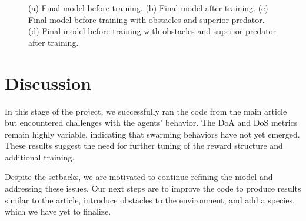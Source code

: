 \documentclass[9pt]{pnas-new}
\begin{document}
\begin{figure}[ht]
		\caption{(a) Final model before training. (b) Final model after training. (c) Final model before training with obstacles and superior predator. (d) Final model before training with obstacles and superior predator after training. }
		\label{fig:final}
	\end{figure}
	
	
	\section*{Discussion}
	In this stage of the project, we successfully ran the code from the main article but encountered challenges with the agents' behavior. 
	The DoA and DoS metrics remain highly variable, indicating that swarming behaviors have not yet emerged. 
	These results suggest the need for further tuning of the reward structure and additional training.
	
	Despite the setbacks, we are motivated to continue refining the model and addressing these issues. 
	Our next steps are to improve the code to produce results similar to the article, introduce obstacles to the environment, and add a species, which we have yet to finalize.
	
	\showacknow %
	
	
	\begin{multicols}{2}
	\end{multicols}
	
	
\end{document}
